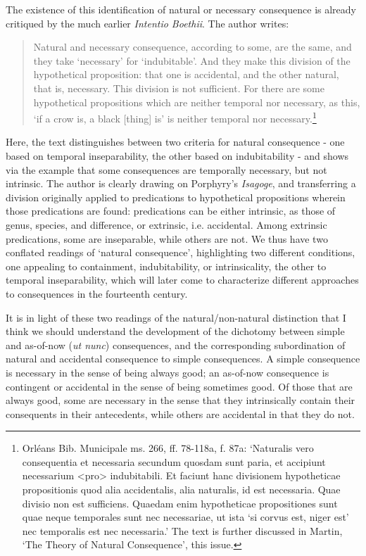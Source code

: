 \documentclass[]{article}
\begin{document}
The existence of this identification of natural or necessary consequence is already critiqued by the much earlier \textit{Intentio Boethii}. The author writes: 
\begin{quote}
	Natural and necessary consequence, according to some, are the same, and they take `necessary' for `indubitable'. And they make this division of the hypothetical proposition: that one is accidental, and the other natural, that is, necessary. This division is not sufficient. For there are some hypothetical propositions which are neither temporal nor necessary, as this, `if a crow is, a black [thing] is' is neither temporal nor necessary.\footnote{Orl\'{e}ans Bib. Municipale ms. 266, ff. 78-118a, f. 87a: `Naturalis vero consequentia et necessaria secundum quosdam sunt paria, et accipiunt necessarium <pro> indubitabili. Et faciunt hanc divisionem hypotheticae propositionis quod alia accidentalis, alia naturalis, id est necessaria. Quae divisio non est sufficiens. Quaedam enim hypotheticae propositiones sunt quae neque temporales sunt nec necessariae, ut ista `si corvus est, niger est' nec temporalis est nec necessaria.' The text is further discussed in Martin, `The Theory of Natural Consequence', this issue.}
\end{quote}
Here, the text distinguishes between two criteria for natural consequence - one based on temporal inseparability, the other based on indubitability - and shows via the example that some consequences are temporally necessary, but not intrinsic. The author is clearly drawing on Porphyry's \textit{Isagoge}, and transferring a division originally applied to predications to hypothetical propositions wherein those predications are found: predications can be either intrinsic, as those of genus, species, and difference, or extrinsic, i.e. accidental. Among extrinsic predications, some are inseparable, while others are not. We thus have two conflated readings of `natural consequence', highlighting two different conditions, one appealing to containment, indubitability, or intrinsicality, the other to temporal inseparability, which will later come to characterize different approaches to consequences in the fourteenth century. 

It is in light of these two readings of the natural/non-natural distinction that I think we should understand the development of the dichotomy between simple and as-of-now (\textit{ut nunc}) consequences, and the corresponding subordination of natural and accidental consequence to simple consequences. A simple consequence is necessary in the sense of being always good; an as-of-now consequence is contingent or accidental in the sense of being sometimes good. Of those that are always good, some are necessary in the sense that they intrinsically contain their consequents in their antecedents, while others are accidental in that they do not.
\end{document}

